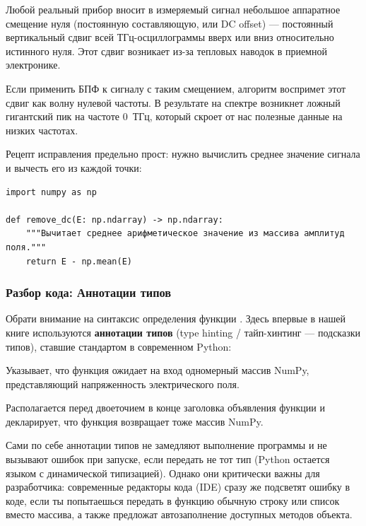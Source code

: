 Любой реальный прибор вносит в измеряемый сигнал небольшое аппаратное смещение нуля (постоянную составляющую, или DC offset) — постоянный вертикальный сдвиг всей ТГц-осциллограммы вверх или вниз относительно истинного нуля. Этот сдвиг возникает из-за тепловых наводок в приемной электронике.

Если применить БПФ к сигналу с таким смещением, алгоритм воспримет этот сдвиг как волну нулевой частоты. В результате на спектре возникнет ложный гигантский пик на частоте $0$~ТГц, который скроет от нас полезные данные на низких частотах.

Рецепт исправления предельно прост: нужно вычислить среднее значение сигнала и вычесть его из каждой точки:

\begin{listing}[H]
	\caption{Удаление постоянной составляющей (spectrum.py)}
	\begin{verbatim}
import numpy as np

def remove_dc(E: np.ndarray) -> np.ndarray:
    """Вычитает среднее арифметическое значение из массива амплитуд поля."""
    return E - np.mean(E)
	\end{verbatim}
\end{listing}



\subsubsection{Разбор кода: Аннотации типов}

Обрати внимание на синтаксис определения функции . Здесь впервые в нашей книге используются \textbf{аннотации типов} (type hinting / тайп-хинтинг --- подсказки типов), ставшие стандартом в современном Python:
\begin{syntaxdesc}
    \item[Аннотация аргумента (строка 3) \mycode{E: np.ndarray}] Указывает, что функция ожидает на вход одномерный массив NumPy, представляющий напряженность электрического поля.
    \item[Аннотация результата (строка 3) \mycode{-> np.ndarray}] Располагается перед двоеточием в конце заголовка объявления функции и декларирует, что функция возвращает тоже массив NumPy.
\end{syntaxdesc}
Сами по себе аннотации типов не замедляют выполнение программы и не вызывают ошибок при запуске, если передать не тот тип (Python остается языком с динамической типизацией). Однако они критически важны для разработчика: современные редакторы кода (IDE) сразу же подсветят ошибку в коде, если ты попытаешься передать в функцию обычную строку или список вместо массива, а также предложат автозаполнение доступных методов объекта.

